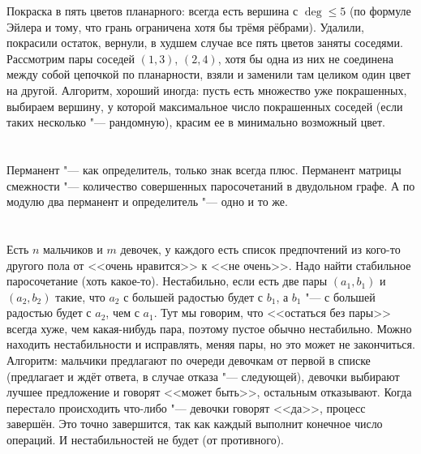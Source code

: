 Покраска в пять цветов планарного: всегда есть вершина с $\deg \le 5$ (по формуле Эйлера и тому, что грань ограничена хотя бы трёмя рёбрами).
Удалили, покрасили остаток, вернули, в худшем случае все пять цветов заняты соседями.
Рассмотрим пары соседей $(1,3)$, $(2,4)$, хотя бы одна из них не соединена между собой цепочкой по планарности, взяли и заменили там целиком один цвет на другой.
Алгоритм, хороший иногда: пусть есть множество уже покрашенных,
выбираем вершину, у которой максимальное число покрашенных соседей (если таких несколько "--- рандомную), красим ее в минимально возможный цвет.

\section{} %
Перманент "--- как определитель, только знак всегда плюс.
Перманент матрицы смежности "--- количество совершенных паросочетаний в двудольном графе.
А по модулю два перманент и определитель "--- одно и то же.

\section{} %
Есть $n$ мальчиков и $m$ девочек, у каждого есть список предпочтений из кого-то другого пола от <<очень нравится>> к <<не очень>>.
Надо найти стабильное паросочетание (хоть какое-то).
Нестабильно, если есть две пары $(a_1, b_1)$ и $(a_2, b_2)$ такие, что $a_2$ с большей радостью будет с $b_1$, а $b_1$ "--- с большей радостью будет с $a_2$, чем с $a_1$.
Тут мы говорим, что <<остаться без пары>> всегда хуже, чем какая-нибудь пара, поэтому пустое обычно нестабильно.
Можно находить нестабильности и исправлять, меняя пары, но это может не закончиться.
Алгоритм: мальчики предлагают по очереди девочкам от первой в списке (предлагает и ждёт ответа, в случае отказа "--- следующей), девочки выбирают лучшее предложение и говорят <<может быть>>, остальным отказывают.
Когда перестало происходить что-либо "--- девочки говорят <<да>>, процесс завершён.
Это точно завершится, так как каждый выполнит конечное число операций.
И нестабильностей не будет (от противного).
